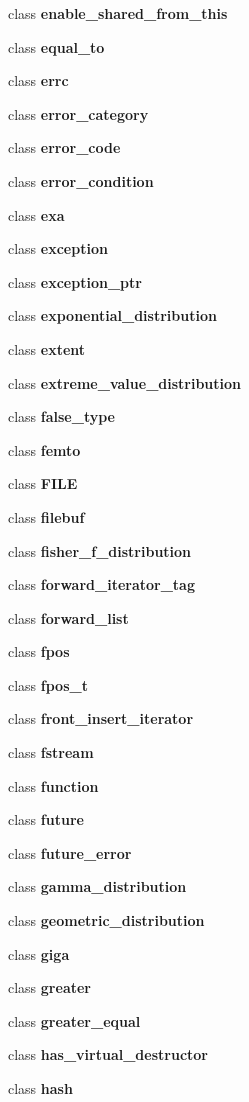 \begin{DoxyCompactItemize}
class \textbf{ enable\+\_\+shared\+\_\+from\+\_\+this}
\item 
class \textbf{ equal\+\_\+to}
\item 
class \textbf{ errc}
\item 
class \textbf{ error\+\_\+category}
\item 
class \textbf{ error\+\_\+code}
\item 
class \textbf{ error\+\_\+condition}
\item 
class \textbf{ exa}
\item 
class \textbf{ exception}
\item 
class \textbf{ exception\+\_\+ptr}
\item 
class \textbf{ exponential\+\_\+distribution}
\item 
class \textbf{ extent}
\item 
class \textbf{ extreme\+\_\+value\+\_\+distribution}
\item 
class \textbf{ false\+\_\+type}
\item 
class \textbf{ femto}
\item 
class \textbf{ F\+I\+LE}
\item 
class \textbf{ filebuf}
\item 
class \textbf{ fisher\+\_\+f\+\_\+distribution}
\item 
class \textbf{ forward\+\_\+iterator\+\_\+tag}
\item 
class \textbf{ forward\+\_\+list}
\item 
class \textbf{ fpos}
\item 
class \textbf{ fpos\+\_\+t}
\item 
class \textbf{ front\+\_\+insert\+\_\+iterator}
\item 
class \textbf{ fstream}
\item 
class \textbf{ function}
\item 
class \textbf{ future}
\item 
class \textbf{ future\+\_\+error}
\item 
class \textbf{ gamma\+\_\+distribution}
\item 
class \textbf{ geometric\+\_\+distribution}
\item 
class \textbf{ giga}
\item 
class \textbf{ greater}
\item 
class \textbf{ greater\+\_\+equal}
\item 
class \textbf{ has\+\_\+virtual\+\_\+destructor}
\item 
class \textbf{ hash}
\item 

\end{DoxyCompactItemize}
